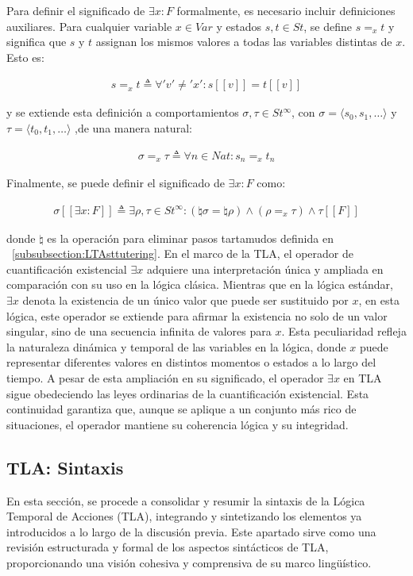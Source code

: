 Para definir el significado de $\exists x : F$ formalmente, es necesario incluir definiciones auxiliares. Para cualquier variable $x \in Var$ y estados $s,t \in St$, se define $s =_x t$ y significa que $s$ y $t$ assignan los mismos valores a todas las variables distintas de $x$. Esto es:

\begin{align}
s =_x t \triangleq \forall 'v' \neq 'x' : s[[v]] = t[[v]]
\end{align}

y se extiende esta definición a comportamientos $\sigma,\tau \in St^\infty$, con $\sigma = \langle s_0, s_1, \ldots \rangle$ y $\tau = \langle t_0, t_1, \ldots \rangle$ ,de una manera natural:

\begin{align}
\sigma =_x \tau \triangleq \forall n \in Nat : s_n =_x t_n
\end{align}

\noindent
Finalmente, se puede definir el significado de $\exists x : F$ como:

\begin{align}
\sigma[[\exists x : F]] \triangleq \exists \rho, \tau \in St^\infty : (\natural \sigma = \natural \rho) \land (\rho =_x \tau) \land \tau[[F]]
\end{align}

donde $\natural$ es la operación para eliminar pasos tartamudos definida en ~\ref{subsubsection:LTAsttutering}. En el marco de la TLA, el operador de cuantificación existencial $\exists x$ adquiere una interpretación única y ampliada en comparación con su uso en la lógica clásica. Mientras que en la lógica estándar, $\exists x$ denota la existencia de un único valor que puede ser sustituido por $x$, en esta lógica, este operador se extiende para afirmar la existencia no solo de un valor singular, sino de una secuencia infinita de valores para $x$. Esta peculiaridad refleja la naturaleza dinámica y temporal de las variables en la lógica, donde $x$ puede representar diferentes valores en distintos momentos o estados a lo largo del tiempo. A pesar de esta ampliación en su significado, el operador $\exists x$ en TLA sigue obedeciendo las leyes ordinarias de la cuantificación existencial. Esta continuidad garantiza que, aunque se aplique a un conjunto más rico de situaciones, el operador mantiene su coherencia lógica y su integridad.

\subsection{TLA: Sintaxis}\label{subsection:TLASyntax}
En esta sección, se procede a consolidar y resumir la sintaxis de la Lógica Temporal de Acciones (TLA), integrando y sintetizando los elementos ya introducidos a lo largo de la discusión previa. Este apartado sirve como una revisión estructurada y formal de los aspectos sintácticos de TLA, proporcionando una visión cohesiva y comprensiva de su marco lingüístico.

